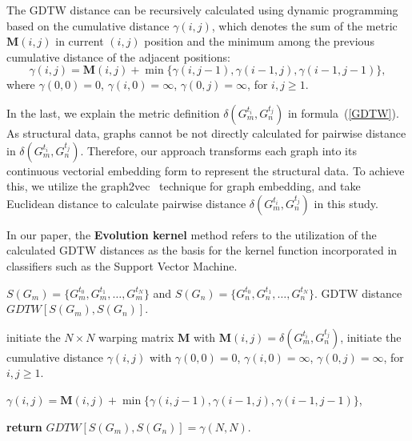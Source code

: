 \documentclass[10pt,journal,compsoc]{IEEEtran}
\begin{document}
The GDTW distance can be recursively calculated using dynamic programming~\cite{dynamic-programming} based on the cumulative distance $\gamma(i, j)$, which denotes the sum of the metric $\mathbf{M}(i, j)$ in current $(i, j)$ position and the minimum among the previous cumulative distance of the adjacent positions:
\begin{equation}\label{GDTW-DP}
  \gamma(i, j) = \mathbf{M}(i, j) + \min\{ \gamma(i, j-1), \gamma(i-1, j), \gamma(i-1, j-1) \},
\end{equation}
where $\gamma(0, 0) = 0$, $\gamma(i, 0) = \infty$, $\gamma(0, j) = \infty$, for $i, j \geq 1$.


In the last, we explain the metric definition $\delta(G_{m}^{t_{i}}, G_{n}^{t_{j}})$ in formula~(\ref{GDTW}). As structural data, graphs cannot be not directly calculated for pairwise distance in $\delta(G_{m}^{t_{i}}, G_{n}^{t_{j}})$. Therefore, our approach transforms each graph into its continuous vectorial embedding form to represent the structural data. To achieve this, we utilize the graph2vec~\cite{graph2vec} technique for graph embedding, and take Euclidean distance to calculate pairwise distance $\delta(G_{m}^{t_{i}}, G_{n}^{t_{j}})$ in this study.


In our paper, the \textbf{Evolution kernel} method refers to the utilization of the calculated GDTW distances as the basis for the kernel function incorporated in classifiers such as the Support Vector Machine.


\begin{algorithm}
	\renewcommand{\algorithmicrequire}{\textbf{Input:}}
	\renewcommand{\algorithmicensure}{\textbf{Output:}}
	\caption{Graph Dynamic Time Warping}
	\label{Algorithm-Graph-Dynamic-Time-Warping}
	\begin{algorithmic}[1]
		\REQUIRE $S(G_{m}) = \{G_{m}^{t_{0}}, G_{m}^{t_{1}}, \ldots, G_{m}^{t_{N}}\}$ and $S(G_{n}) = \{G_{n}^{t_{0}}, G_{n}^{t_{1}}, \ldots, G_{n}^{t_{N}}\}$.
		\ENSURE GDTW distance $GDTW[S(G_{m}), S(G_{n})]$.

        \STATE initiate the $N \times N$ warping matrix $\mathbf{M}$ with $\mathbf{M}(i, j) = \delta(G_{m}^{t_{i}}, G_{n}^{t_{j}})$,
        \STATE initiate the cumulative distance $\gamma(i, j)$ with $\gamma(0, 0) = 0$, $\gamma(i, 0) = \infty$, $\gamma(0, j) = \infty$, for $i, j \geq 1$.

                \STATE $\gamma(i, j) = \mathbf{M}(i, j) + \min\{ \gamma(i, j-1), \gamma(i-1, j), \gamma(i-1, j-1) \}$,
            \ENDFOR
        \ENDFOR

        \STATE \textbf{return} $GDTW[S(G_{m}), S(G_{n})] = \gamma(N, N)$.
	\end{algorithmic}
\end{algorithm}
\end{document}
